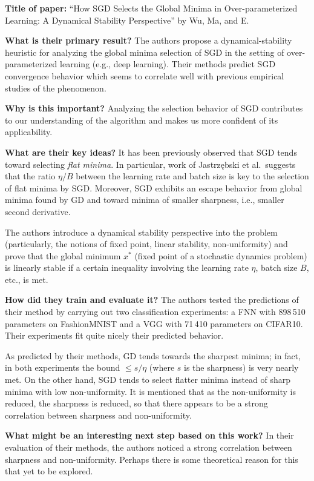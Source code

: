 \noindent \textbf{Title of paper:} ``How SGD Selects the Global Minima in
Over-parameterized Learning: A Dynamical Stability Perspective'' by Wu, Ma, and
E.

\noindent\textbf{What is their primary result?} The authors propose a
dynamical-stability heuristic for analyzing the global minima selection of SGD
in the setting of over-parameterized learning (e.g., deep learning). Their
methods predict SGD convergence behavior which seems to correlate well with
previous empirical studies of the phenomenon.

\noindent\textbf{Why is this important?} Analyzing the selection behavior of SGD
contributes to our understanding of the algorithm and makes us more confident of
its applicability.

\noindent\textbf{What are their key ideas?} It has been previously observed that
SGD tends toward selecting \emph{flat minima}. In particular, work of
Jastrzębski et al.\ suggests that the ratio $\eta/B$ between the learning rate
and batch size is key to the selection of flat minima by SGD. Moreover, SGD
exhibits an escape behavior from global minima found by GD and toward minima of
smaller sharpness, i.e., smaller second derivative.

The authors introduce a dynamical stability perspective into the problem
(particularly, the notions of fixed point, linear stability, non-uniformity) and
prove that the global minimum $x^*$ (fixed point of a stochastic dynamics
problem) is linearly stable if a certain inequality involving the learning rate
$\eta$, batch size $B$, etc., is met.



\noindent\textbf{How did they train and evaluate it?} The authors tested the
predictions of their method by carrying out two classification experiments: a
FNN with 898\,510 parameters on FashionMNIST and a VGG with 71\,410 parameters
on CIFAR10. Their experiments fit quite nicely their predicted behavior.

As predicted by their methods, GD tends towards the sharpest minima; in fact, in
both experiments the bound $\leq s/\eta$ (where $s$ is the sharpness) is very
nearly met. On the other hand, SGD tends to select flatter minima instead of
sharp minima with low non-uniformity. It is mentioned that as the non-uniformity
is reduced, the sharpness is reduced, so that there appears to be a strong
correlation between sharpness and non-uniformity.

\noindent\textbf{What might be an interesting next step based on this work?} In
their evaluation of their methods, the authors noticed a strong correlation
between sharpness and non-uniformity. Perhaps there is some theoretical reason
for this that yet to be explored.


